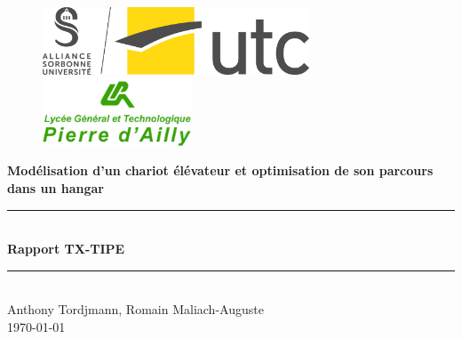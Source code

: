 \documentclass{report-UTC}
\begin{document}
\thispagestyle{empty}

\begin{figure}[h]
\centering
\includegraphics[height=2cm]{assets/logo_utc.jpg}
	\hspace{1cm}
\includegraphics[height=2cm]{assets/logo_dailly.png}
\end{figure}

\vspace{1.5cm}

\begin{center}
\huge{\textbf{Modélisation d'un chariot élévateur et optimisation de son parcours dans un hangar}} \\
\vspace{1cm}
\noindent\rule{10cm}{0.4pt} \\
\vspace{0.5cm}
\huge{\textbf{Rapport TX-TIPE}} \\
\vspace{0.5cm}
\noindent\rule{10cm}{0.4pt}  \\
\vspace{2cm}
\Large{Anthony Tordjmann, Romain Maliach-Auguste} \\
\vspace{1.5cm}
\Large{\today}
\end{center}

\renewcommand*\contentsname{Sommaire}

\clearpage

\tableofcontents\thispagestyle{empty}

\clearpage

\clearpage

\clearpage

\clearpage

\clearpage

\clearpage

\clearpage
\printbibliography 
\end{document}
